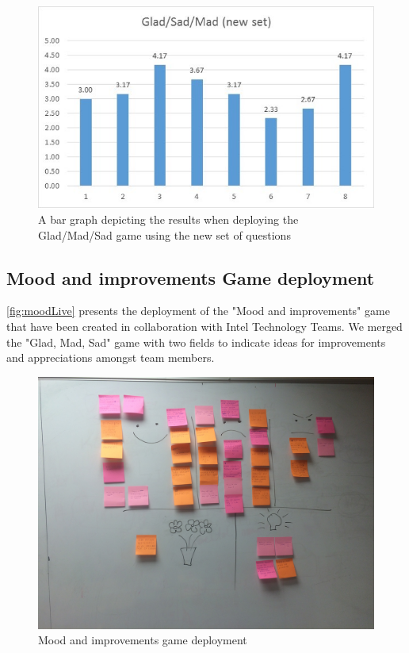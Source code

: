 \begin{figure}[!htbp]
\caption{A bar graph depicting the results when deploying the Glad/Mad/Sad game using the new set of questions}
\label{fig:gmsResultsNew}
\centering
\includegraphics[width=1\textwidth]{charts/gmdNewSet}
\end{figure}

\subsection{Mood and improvements Game deployment}
\autoref{fig:moodLive} presents the deployment of the "Mood and improvements" game that have been created in collaboration with Intel Technology Teams. We merged the "Glad, Mad, Sad" game with two fields to indicate ideas for improvements and appreciations amongst team members. 

\begin{figure}[!htbp]
\caption{Mood and improvements game deployment}
\label{fig:moodLive}
\centering
\includegraphics[width=1\textwidth]{live/moodLive}
\end{figure}

